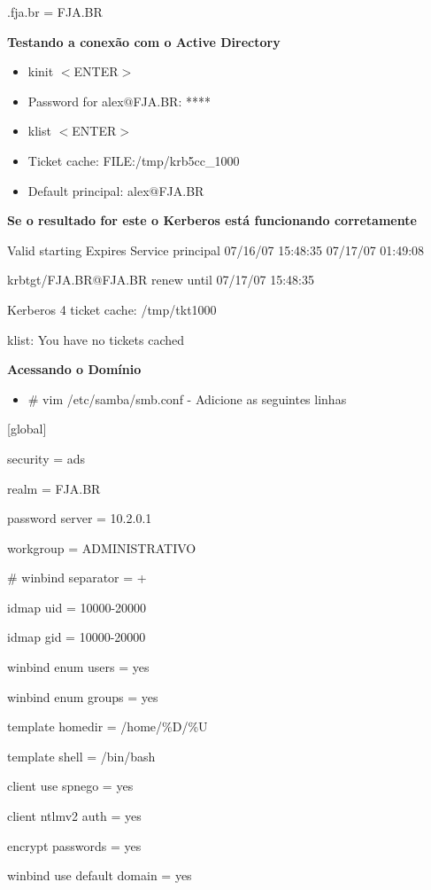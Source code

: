 .fja.br = FJA.BR

\textbf {Testando a conexão com o Active Directory}

\begin{itemize}
	\item {kinit $<$ENTER$>$}
	\item {Password for alex$@$FJA.BR: ****}
	\item {klist $<$ENTER$>$}
	\item {Ticket cache: FILE:/tmp/krb5cc\_1000}
	\item {Default principal: alex$@$FJA.BR}
\end{itemize}

\textbf {Se o resultado for este o Kerberos está funcionando corretamente}

	Valid starting Expires Service principal 07/16/07 15:48:35  07/17/07 01:49:08  

	krbtgt/FJA.BR@FJA.BR renew until 07/17/07 15:48:35
	
	Kerberos 4 ticket cache: /tmp/tkt1000
	
	klist: You have no tickets cached

\textbf{Acessando o Domínio}

\begin{itemize}
	\item {\# vim /etc/samba/smb.conf} -  Adicione as seguintes linhas
\end{itemize}

[global]

        security = ads

        realm = FJA.BR

        password server = 10.2.0.1

        workgroup = ADMINISTRATIVO

\#       winbind separator = +

        idmap uid = 10000-20000

        idmap gid = 10000-20000

        winbind enum users = yes

        winbind enum groups = yes

        template homedir = /home/\%D/\%U

        template shell = /bin/bash

        client use spnego = yes

        client ntlmv2 auth = yes

        encrypt passwords = yes

        winbind use default domain = yes

